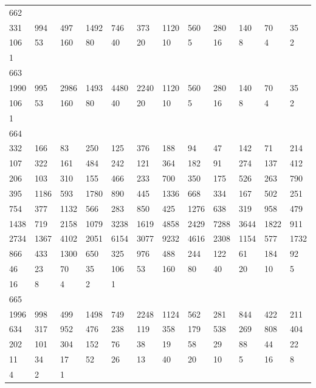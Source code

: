 \begin{longtable}{llllllllllll}
662&&&&&&&&&&&\\
331& 994& 497& 1492& 746& 373& 1120& 560& 280& 140& 70& 35\\
106& 53& 160& 80& 40& 20& 10& 5& 16& 8& 4& 2\\
1& \\

663&&&&&&&&&&&\\
1990& 995& 2986& 1493& 4480& 2240& 1120& 560& 280& 140& 70& 35\\
106& 53& 160& 80& 40& 20& 10& 5& 16& 8& 4& 2\\
1& \\

664&&&&&&&&&&&\\
332& 166& 83& 250& 125& 376& 188& 94& 47& 142& 71& 214\\
107& 322& 161& 484& 242& 121& 364& 182& 91& 274& 137& 412\\
206& 103& 310& 155& 466& 233& 700& 350& 175& 526& 263& 790\\
395& 1186& 593& 1780& 890& 445& 1336& 668& 334& 167& 502& 251\\
754& 377& 1132& 566& 283& 850& 425& 1276& 638& 319& 958& 479\\
1438& 719& 2158& 1079& 3238& 1619& 4858& 2429& 7288& 3644& 1822& 911\\
2734& 1367& 4102& 2051& 6154& 3077& 9232& 4616& 2308& 1154& 577& 1732\\
866& 433& 1300& 650& 325& 976& 488& 244& 122& 61& 184& 92\\
46& 23& 70& 35& 106& 53& 160& 80& 40& 20& 10& 5\\
16& 8& 4& 2& 1& \\

665&&&&&&&&&&&\\
1996& 998& 499& 1498& 749& 2248& 1124& 562& 281& 844& 422& 211\\
634& 317& 952& 476& 238& 119& 358& 179& 538& 269& 808& 404\\
202& 101& 304& 152& 76& 38& 19& 58& 29& 88& 44& 22\\
11& 34& 17& 52& 26& 13& 40& 20& 10& 5& 16& 8\\
4& 2& 1& \\


\end{longtable}
